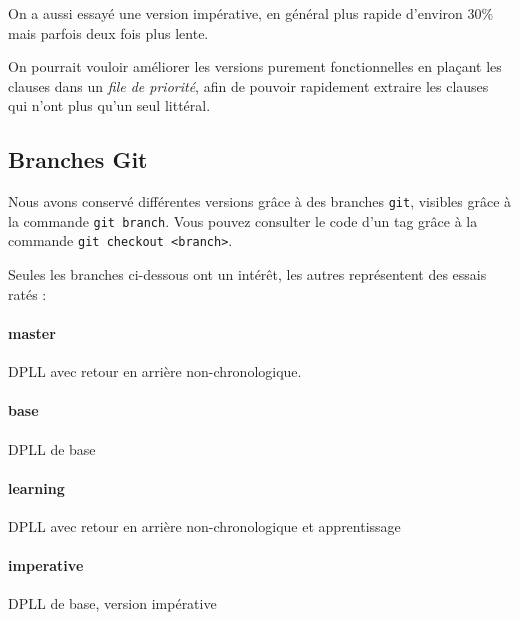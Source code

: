 \documentclass[10pt,a4paper]{article}
\begin{document}
On a aussi essayé une version impérative, en général plus rapide d'environ
$30\%$ mais parfois deux fois plus lente.

On pourrait vouloir améliorer les versions purement fonctionnelles en plaçant
les clauses dans un \emph{file de priorité}, afin de pouvoir rapidement
extraire les clauses qui n'ont plus qu'un seul littéral.


\subsection{Branches Git}

Nous avons conservé différentes versions grâce à des branches {\tt git}, visibles grâce
à la commande {\tt git branch}. Vous pouvez consulter le code d'un tag grâce à la
commande {\tt git checkout <branch>}.

Seules les branches ci-dessous ont un intérêt, les autres représentent des essais ratés :

\paragraph{master} DPLL avec retour en arrière non-chronologique.
\paragraph{base} DPLL de base
\paragraph{learning} DPLL avec retour en arrière non-chronologique et apprentissage
\paragraph{imperative} DPLL de base, version impérative
\end{document}
